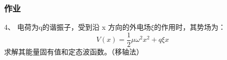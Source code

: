 \begin{frame}
	\frametitle{ 作业 }
	4、	电荷为q的谐振子，受到沿 x 方向的外电场$\xi $的作用时，其势场为：
	\begin{equation*}
		V(x)= \frac{1}{2} \mu \omega ^2 x^2  +q\xi x  
	\end{equation*}
	求解其能量固有值和定态波函数。（移轴法）
\end{frame}	
